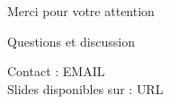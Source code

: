 \documentclass[11pt, aspectratio=169, xcolor={svgnames}]{beamer}
\theoremstyle{definition}
\begin{document}
\begin{frame}[plain]
  \begin{center}
    \vspace{2em}
    {\Large Merci pour votre attention}

    \vspace{2em}

    {\normalsize Questions et discussion}

    \vspace{3em}

    \scriptsize
    Contact : {{EMAIL}} \\
    Slides disponibles sur : {{URL}}
  \end{center}
\end{frame}
\end{document}
